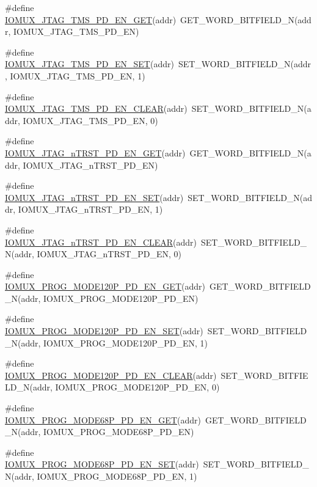 \begin{DoxyCompactItemize}
\item 
\#define \hyperlink{a00559_a7be6febe21501351dce90b26caa15c65}{IOMUX\_\-JTAG\_\-TMS\_\-PD\_\-EN\_\-GET}(addr)~GET\_\-WORD\_\-BITFIELD\_\-N(addr, IOMUX\_\-JTAG\_\-TMS\_\-PD\_\-EN)
\item 
\#define \hyperlink{a00559_a5e566aa7ded8ac47e55a289f02ae969c}{IOMUX\_\-JTAG\_\-TMS\_\-PD\_\-EN\_\-SET}(addr)~SET\_\-WORD\_\-BITFIELD\_\-N(addr, IOMUX\_\-JTAG\_\-TMS\_\-PD\_\-EN, 1)
\item 
\#define \hyperlink{a00559_a392212104b0b928069c5eb9928bd720c}{IOMUX\_\-JTAG\_\-TMS\_\-PD\_\-EN\_\-CLEAR}(addr)~SET\_\-WORD\_\-BITFIELD\_\-N(addr, IOMUX\_\-JTAG\_\-TMS\_\-PD\_\-EN, 0)
\item 
\#define \hyperlink{a00559_a815df786465bb0e1f3e2765976359d69}{IOMUX\_\-JTAG\_\-nTRST\_\-PD\_\-EN\_\-GET}(addr)~GET\_\-WORD\_\-BITFIELD\_\-N(addr, IOMUX\_\-JTAG\_\-nTRST\_\-PD\_\-EN)
\item 
\#define \hyperlink{a00559_ae3cb9c2e42d4d228296ec7496a1b59e4}{IOMUX\_\-JTAG\_\-nTRST\_\-PD\_\-EN\_\-SET}(addr)~SET\_\-WORD\_\-BITFIELD\_\-N(addr, IOMUX\_\-JTAG\_\-nTRST\_\-PD\_\-EN, 1)
\item 
\#define \hyperlink{a00559_ae9c20c93265fede5692b8044a22583ec}{IOMUX\_\-JTAG\_\-nTRST\_\-PD\_\-EN\_\-CLEAR}(addr)~SET\_\-WORD\_\-BITFIELD\_\-N(addr, IOMUX\_\-JTAG\_\-nTRST\_\-PD\_\-EN, 0)
\item 
\#define \hyperlink{a00559_a1356d24d81d91d7d23a71b5d374043d3}{IOMUX\_\-PROG\_\-MODE120P\_\-PD\_\-EN\_\-GET}(addr)~GET\_\-WORD\_\-BITFIELD\_\-N(addr, IOMUX\_\-PROG\_\-MODE120P\_\-PD\_\-EN)
\item 
\#define \hyperlink{a00559_ab7ed40b63618f869a51c52b112f2412d}{IOMUX\_\-PROG\_\-MODE120P\_\-PD\_\-EN\_\-SET}(addr)~SET\_\-WORD\_\-BITFIELD\_\-N(addr, IOMUX\_\-PROG\_\-MODE120P\_\-PD\_\-EN, 1)
\item 
\#define \hyperlink{a00559_ae45ab82cd12ab02352f3d8ce689a9ff8}{IOMUX\_\-PROG\_\-MODE120P\_\-PD\_\-EN\_\-CLEAR}(addr)~SET\_\-WORD\_\-BITFIELD\_\-N(addr, IOMUX\_\-PROG\_\-MODE120P\_\-PD\_\-EN, 0)
\item 
\#define \hyperlink{a00559_ae879cd5ed06c5d41ef6bb5a2deac0bb5}{IOMUX\_\-PROG\_\-MODE68P\_\-PD\_\-EN\_\-GET}(addr)~GET\_\-WORD\_\-BITFIELD\_\-N(addr, IOMUX\_\-PROG\_\-MODE68P\_\-PD\_\-EN)
\item 
\#define \hyperlink{a00559_aa7572ec2810c22279c57bab0014fa61b}{IOMUX\_\-PROG\_\-MODE68P\_\-PD\_\-EN\_\-SET}(addr)~SET\_\-WORD\_\-BITFIELD\_\-N(addr, IOMUX\_\-PROG\_\-MODE68P\_\-PD\_\-EN, 1)
\item 

\end{DoxyCompactItemize}

